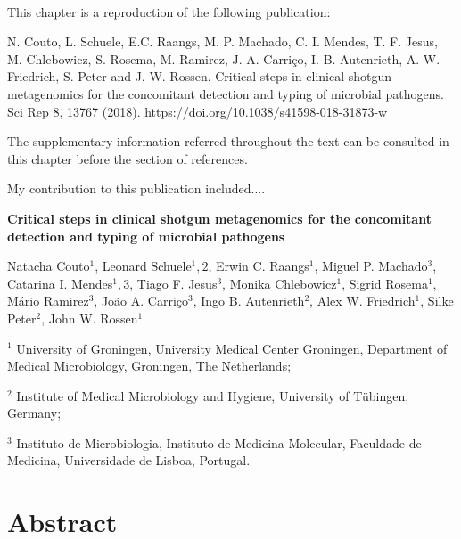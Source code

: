 \mbox{}\\
\vspace{8cm}

This chapter is a reproduction of the following publication:

N. Couto, L. Schuele, E.C. Raangs, M. P. Machado, C. I. Mendes, T. F. Jesus, M. Chlebowicz,  S. Rosema, M. Ramirez, J. A. Carriço, I. B. Autenrieth, A. W. Friedrich, S. Peter and J. W. Rossen. Critical steps in clinical shotgun metagenomics for the concomitant detection and typing of microbial pathogens. Sci Rep 8, 13767 (2018). \url{https://doi.org/10.1038/s41598-018-31873-w}

The supplementary information referred throughout the text can be consulted in
this chapter before the section of references. 

My contribution to this publication included....

\cleardoublepage 

\begin{center}
\large
\textbf{Critical steps in clinical shotgun metagenomics for the concomitant detection and typing of microbial pathogens}
\end{center}

Natacha Couto$^1$, 
Leonard Schuele$^1,2$,
Erwin C. Raangs$^1$,
Miguel P. Machado$^3$, 
Catarina I. Mendes$^1,3$,
Tiago F. Jesus$^3$, 
Monika Chlebowicz$^1$, 
Sigrid Rosema$^1$, 
Mário Ramirez$^3$, 
João A. Carriço$^3$, 
Ingo B. Autenrieth$^2$, 
Alex W. Friedrich$^1$, 
Silke Peter$^2$, 
John W. Rossen$^1$

$^1$ University of Groningen, University Medical Center Groningen, Department of Medical Microbiology, Groningen, The Netherlands;

$^2$ Institute of Medical Microbiology and Hygiene, University of Tübingen, Germany; 

$^3$ Instituto de Microbiologia, Instituto de Medicina Molecular, Faculdade de Medicina, Universidade de Lisboa, Portugal.


\section{Abstract} \label{sec:ch2_abstract}

